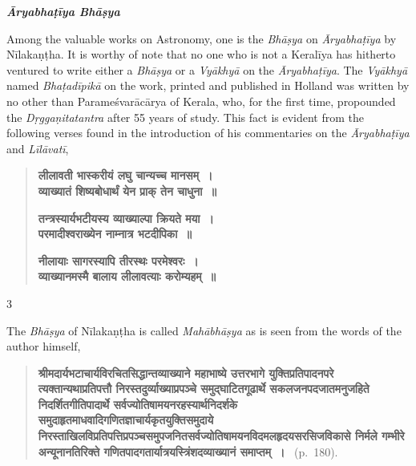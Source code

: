 \documentclass[11pt, openany]{book}
\begin{document}
\begin{minipage}[t]{0.15\textwidth}
\vspace{2cm}
\textbf{\emph{\en Āryabhaṭīya Bhāṣya}}
\end{minipage} 
\begin{minipage}[t]{0.55\textwidth} 
{\en Among the valuable works on Astronomy, one is the \emph{Bhāṣya} on \emph{Āryabhaṭīya} by Nīlakaṇṭha. It is worthy of note that no one who is not a Keralīya has hitherto ventured to write either a \emph{Bhāṣya} or a \emph{Vyākhyā} on the \emph{Āryabhaṭīya}. The \emph{Vyākhyā} named \emph{Bhaṭadīpikā} on the work, printed and published in Holland was written by no other than Parameśvarācārya of Kerala, who, for the first time, propounded the \emph{Dṛggaṇitatantra} after 55 years of study. This fact is evident from the following verses found in the introduction of his commentaries on the \emph{Āryabhaṭīya} and \emph{Līlāvatī}},
\end{minipage}
\begin{quote}
\textbf{ लीलावती भास्करीयं लघु चान्यच्च मानसम्~।\\
व्याख्यातं शिष्यबोधार्थं येन प्राक् तेन चाधुना~॥}

\textbf{ तन्त्रस्यार्यभटीयस्य व्याख्याल्पा क्रियते मया~।\\
परमादीश्वराख्येन नाम्नात्र भटदीपिका~॥}

\textbf{नीलायाः सागरस्यापि तीरस्थः परमेश्वरः~।\\
व्याख्यानमस्मै बालाय लीलावत्याः करोम्यहम्~॥}
\end{quote}


\newpage

\begin{center} 3 \end{center}
\thispagestyle{empty} 
{\en The \emph{Bhāṣya} of Nīlakaṇṭha is called \emph{Mahābhāṣya} as is seen from the words of the author himself,}

\begin{quote} 
\textbf{श्रीमदार्यभटाचार्यविरचितसिद्धान्तव्याख्याने महाभाष्ये उत्तरभागे
युक्तिप्रतिपादनपरे त्यक्तान्यथाप्रतिपत्तौ निरस्तदुर्व्याख्याप्रपञ्चे
समुद्घाटितगूढार्थे सकलजनपदजातमनुजहिते निदर्शितगीतिपादार्थे सर्वज्योतिषामयनरहस्यार्थनिदर्शके
समुदाहृतमाधवादिगणितज्ञाचार्यकृतयुक्तिसमुदाये
निरस्ताखिलविप्रतिपत्तिप्रपञ्चसमुपजनितसर्वज्योतिषामयनविदमलहृदयसरसिजविकासे निर्मले गम्भीरे अन्यूनानतिरिक्ते गणितपादगतार्यात्रयस्त्रिंशदव्याख्यानं समाप्तम्~।}~ (p.~180). 
\end{quote}
\end{document}
